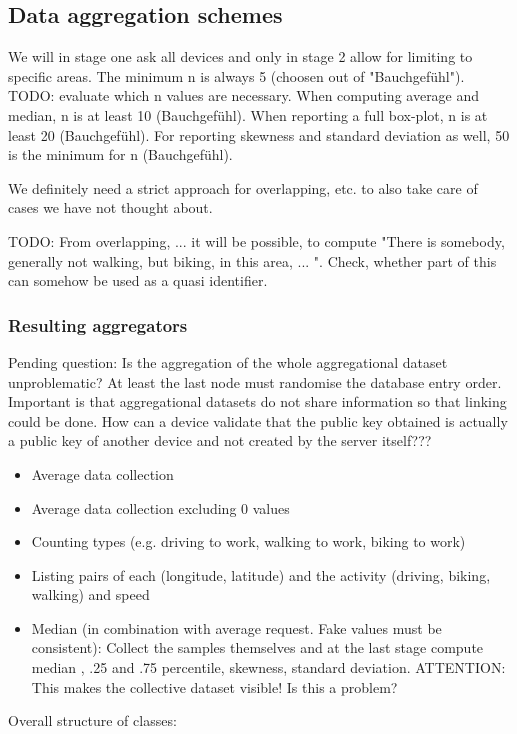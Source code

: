 \subsection{Data aggregation schemes}
We will in stage one ask all devices and only in stage 2 allow for limiting to specific areas. The minimum n is always 5 (choosen out of "Bauchgefühl").
TODO: evaluate which n values are necessary.
When computing average and median, n is at least 10 (Bauchgefühl).
When reporting a full box-plot, n is at least 20 (Bauchgefühl). 
For reporting skewness and standard deviation as well, 50 is the minimum for n (Bauchgefühl).

We definitely need a strict approach for overlapping, etc. to also take care of cases we have not thought about.

TODO: From overlapping, ... it will be possible, to compute "There is somebody, generally not walking, but biking, in this area, ... ". Check, whether part of this can somehow be used as a quasi identifier.
\subsubsection{Resulting aggregators}
Pending question: Is the aggregation of the whole aggregational dataset unproblematic? At least the last node must randomise the database entry order.
Important is that aggregational datasets do not share information so that linking could be done.
How can a device validate that the public key obtained is actually a public key of another device and not created by the server itself???
\begin{itemize}
	\item Average data collection
	\item Average data collection excluding 0 values
	\item Counting types (e.g. driving to work, walking to work, biking to work)
	\item Listing pairs of each (longitude, latitude) and the activity (driving, biking, walking) and speed
	\item Median (in combination with average request. Fake values must be consistent): Collect the samples themselves and at the last stage compute median , .25 and .75 percentile, skewness, standard deviation. ATTENTION: This makes the collective dataset visible! Is this a problem?
\end{itemize}

Overall structure of classes:

